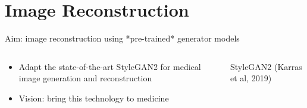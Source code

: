 
\section{Image Reconstruction}

\begin{frame}{Aim: image reconstruction using *pre-trained* generator models}

\begin{columns}
 \begin{column}{0.5\textwidth}
  
  \begin{itemize}
   \item Adapt the state-of-the-art StyleGAN2 for medical image generation and reconstruction

   \vspace{2em}
   
   \item Vision: bring this technology to medicine
  \end{itemize}
  
 \vspace{1em}
  
  
  
 \end{column} 
 
 \begin{column}{0.5\textwidth}
 \centering
 StyleGAN2 (Karras et al, 2019)
 \end{column}

\end{columns}



\end{frame}

